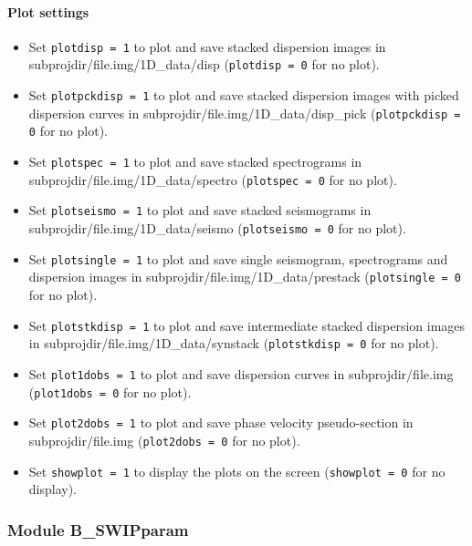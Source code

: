 \documentclass[twoside,a4paper]{article}
\begin{document}
\paragraph{Plot settings}
\begin{itemize}
\setlength\itemsep{2ex}
\setlength{\parindent}{5ex}

\item Set \verb|plotdisp = 1| to plot and save stacked dispersion images in subprojdir/file.img/1D\_data/disp (\verb|plotdisp = 0| for no plot).

\item Set \verb|plotpckdisp = 1| to plot and save stacked dispersion images with picked dispersion curves in subprojdir/file.img/1D\_data/disp\_pick (\verb|plotpckdisp = 0| for no plot).

\item Set \verb|plotspec = 1| to plot and save stacked spectrograms in subprojdir/file.img/1D\_data/spectro (\verb|plotspec = 0| for no plot).

\item Set \verb|plotseismo = 1| to plot and save stacked seismograms in subprojdir/file.img/1D\_data/seismo (\verb|plotseismo = 0| for no plot).

\item Set \verb|plotsingle = 1| to plot and save single seismogram, spectrograms and dispersion images in subprojdir/file.img/1D\_data/prestack (\verb|plotsingle = 0| for no plot).

\item Set \verb|plotstkdisp = 1| to plot and save intermediate stacked dispersion images in subprojdir/file.img/1D\_data/synstack (\verb|plotstkdisp = 0| for no plot).

\item Set \verb|plot1dobs = 1| to plot and save dispersion curves in subprojdir/file.img (\verb|plot1dobs = 0| for no plot).

\item Set \verb|plot2dobs = 1| to plot and save phase velocity pseudo-section in subprojdir/file.img (\verb|plot2dobs = 0| for no plot).

\item Set \verb|showplot = 1| to display the plots on the screen (\verb|showplot = 0| for no display).
\end{itemize}



\subsubsection{Module B\_SWIPparam}
\end{document}
